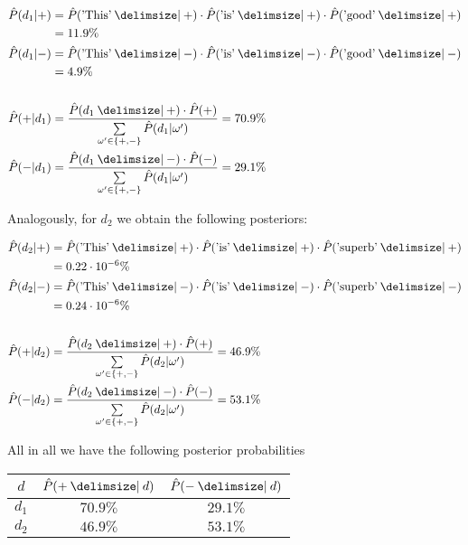 \begin{equation*}
\begin{split}
\hat{P}(d_1|+) &=  \hat{P}(\text{'This'} \given +) \cdot \hat{P}(\text{'is'} \given +) \cdot \hat{P}(\text{'good'} \given
+)\\ &= 11.9 \% \\
\hat{P}(d_1|-) &=  \hat{P}(\text{'This'} \given -) \cdot \hat{P}(\text{'is'} \given -) \cdot \hat{P}(\text{'good'} \given
-) \\ &= 4.9 \% \\
\\
\hat{P}(+|d_1) &= \frac{\hat{P}(d_1 \given +)\cdot \hat{P}(+)}{\sum\limits_{\omega' \in \{+,-\}}
\hat{P}(d_1 | \omega')} = 70.9 \% \\
\hat{P}(-|d_1) &= \frac{\hat{P}(d_1 \given -)\cdot
\hat{P}(-)}{\sum\limits_{\omega' \in \{+,-\}} \hat{P}(d_1 | \omega')} = 29.1 \%
\end{split}
\end{equation*}

Analogously, for $d_2$ we obtain the following posteriors:

\begin{equation*}
\begin{split}
\hat{P}(d_2|+) &=  \hat{P}(\text{'This'} \given +) \cdot \hat{P}(\text{'is'}
\given +) \cdot \hat{P}(\text{'superb'} \given +)\\ &= 0.22 \cdot 10^{-6} \% \\
\hat{P}(d_2|-) &=  \hat{P}(\text{'This'} \given -) \cdot \hat{P}(\text{'is'} \given -) \cdot \hat{P}(\text{'superb'} \given
-) \\ &= 0.24 \cdot 10^{-6} \% \\
\\
\hat{P}(+|d_2) &= \frac{\hat{P}(d_2 \given +)\cdot \hat{P}(+)}{\sum\limits_{\omega' \in \{+,-\}}
\hat{P}(d_2 | \omega')} = 46.9 \% \\
\hat{P}(-|d_2) &= \frac{\hat{P}(d_2 \given -)\cdot
\hat{P}(-)}{\sum\limits_{\omega' \in \{+,-\}} \hat{P}(d_2 | \omega')} = 53.1 \%
\end{split}
\end{equation*}

All in all we have the following posterior probabilities

\begin{center}
\begin{tabular}{c|c|c}
$d$ & $\hat{P}(+ \given d)$ & $\hat{P}(- \given d)$ \\
\hline
$d_1$ & $70.9 \%$ & $29.1 \%$ \\
$d_2$ & $46.9 \%$ & $53.1 \%$ \\
\end{tabular}
\end{center}

